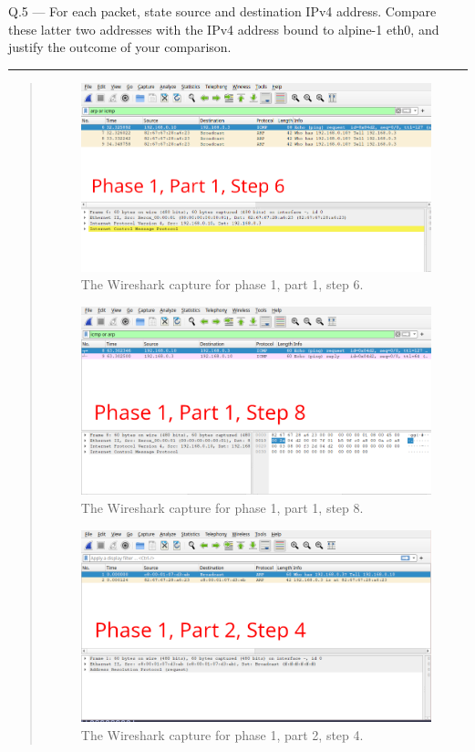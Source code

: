 \documentclass{article}
\newcommand\Que[2]{%
\begin{samepage}
\leavevmode\par
\noindent
Q.#1 --- #2\par\vspace{10pt}\hrule\vspace{10pt}
\end{samepage}}
\newenvironment{ans}
{\fbox{Answer}\begin{quote}\nopagebreak}
{\end{quote}}
\begin{document}
\newpage

\Que{5}{For each packet, state source and destination IPv4
address. Compare these latter two addresses with the IPv4
address bound to alpine-1 eth0, and justify the outcome of your
comparison.}

\begin{ans}
\begin{figure}[H]
\centering
\includegraphics[width=14cm]{data/q5-capture1.png}
\caption{The Wireshark capture for phase 1, part 1, step 6.}
\label{fig:wireshark-capture1-q5}
\end{figure}

\begin{figure}[H]
\centering
\includegraphics[width=14cm]{data/q5-capture2.png}
\caption{The Wireshark capture for phase 1, part 1, step 8.}
\label{fig:wireshark-capture2-q5}
\end{figure}

\begin{figure}[H]
\centering
\includegraphics[width=14cm]{data/q5-capture3.png}
\caption{The Wireshark capture for phase 1, part 2, step 4.}
\label{fig:wireshark-capture3-q5}
\end{figure}


\end{ans}
\end{document}

